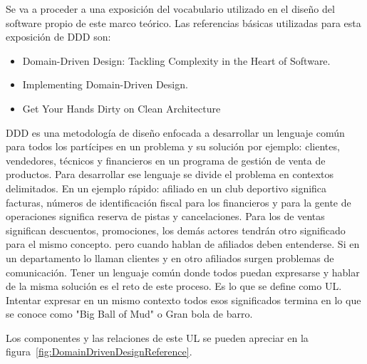 
Se va a proceder a una exposición del vocabulario utilizado en el diseño del software propio de este marco teórico. Las referencias básicas utilizadas para esta exposición de \gls{DDD} son:

\begin{itemize}
    \item Domain-Driven Design: Tackling Complexity in the Heart of Software.\cite{EricEvans2003DDTC}
    \item Implementing Domain-Driven Design.\cite{VaughnVernon2013IDD}
    \item Get Your Hands Dirty on Clean Architecture\cite{TomHombergs2019GYHD}
\end{itemize}

DDD es una metodología de diseño enfocada a desarrollar un lenguaje común para todos los partícipes en un problema y su solución por ejemplo: clientes, vendedores, técnicos y financieros en un programa de gestión de venta de productos. Para desarrollar ese lenguaje se divide el problema en contextos delimitados. En un ejemplo rápido: afiliado en un club deportivo significa facturas, números de identificación fiscal para los financieros y para la gente de operaciones significa reserva de pistas y cancelaciones. Para los de ventas significan descuentos, promociones, los demás actores tendrán otro significado para el mismo concepto. pero cuando hablan de afiliados deben entenderse. Si en un departamento lo llaman clientes y en otro afiliados surgen problemas de comunicación. Tener un lenguaje común donde todos puedan expresarse y hablar de la misma solución es el reto de este proceso. Es lo que se define como \gls{UL}. Intentar expresar en un mismo contexto todos esos significados termina en lo que se conoce como "Big Ball of Mud" o Gran bola de barro.


Los componentes y las relaciones de este UL se pueden apreciar en la figura~\cref{fig:DomainDrivenDesignReference}.

